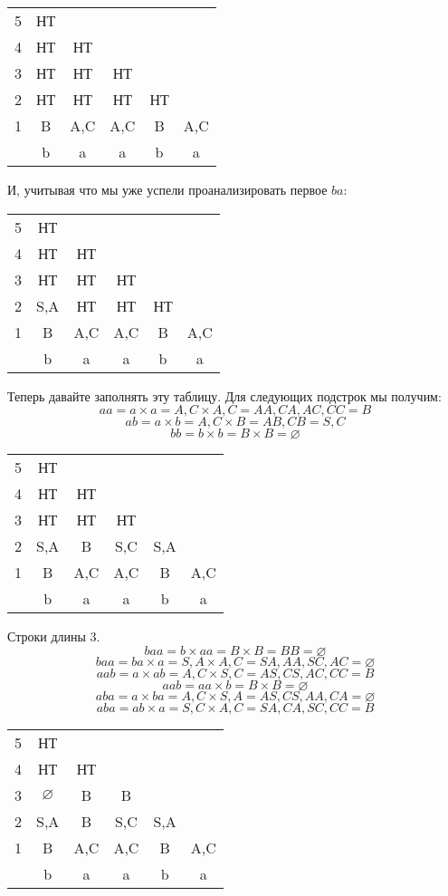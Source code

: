 \documentclass{article}
\begin{document}
\begin{center}
    \begin{tabular}{ c c c c c c}
    5 & НТ & & & & \\ 
    4 & НТ & НТ & &  \\  
    3 & НТ & НТ & НТ &  \\  
    2 & НТ & НТ & НТ & НТ  \\  
    1 & B & A,C & A,C & B & A,C  \\
      & b  &  a &  a & b  &  a 
    \end{tabular}
\end{center}
И, учитывая что мы уже успели проанализировать первое $ba$:
\begin{center}
    \begin{tabular}{ c c c c c c}
    5 & НТ & & & & \\ 
    4 & НТ & НТ & &  \\  
    3 & НТ & НТ & НТ &  \\  
    2 & S,A & НТ & НТ & НТ  \\  
    1 & B & A,C & A,C & B & A,C  \\
      & b  &  a &  a & b  &  a 
    \end{tabular}
\end{center}
Теперь давайте заполнять эту таблицу. Для следующих подстрок мы получим:
$$aa = a\times a = A,C \times A,C = AA, CA, AC, CC = B$$
$$ab = a\times b = A,C \times B = AB, CB = S, C$$
$$bb = b\times b = B \times B = \varnothing$$
\begin{center}
    \begin{tabular}{ c c c c c c}
    5 & НТ & & & & \\ 
    4 & НТ & НТ & &  \\  
    3 & НТ & НТ & НТ &  \\  
    2 & S,A & B & S,C & S,A  \\  
    1 & B & A,C & A,C & B & A,C  \\
      & b  &  a &  a & b  &  a 
    \end{tabular}
\end{center}
Строки длины 3.
$$baa = b\times aa = B \times B = BB = \varnothing$$
$$baa = ba\times a = S,A \times A,C = SA, AA, SC, AC = \varnothing$$
$$aab = a\times ab = A,C \times S,C = AS, CS, AC, CC = B$$
$$aab = aa\times b = B \times B = \varnothing$$
$$aba = a\times ba = A,C \times S,A = AS, CS, AA, CA = \varnothing$$
$$aba = ab\times a = S,C \times A,C = SA, CA, SC, CC = B$$
\begin{center}
    \begin{tabular}{ c c c c c c}
    5 & НТ & & & & \\ 
    4 & НТ & НТ & &  \\  
    3 & $\varnothing$ & B & B &  \\  
    2 & S,A & B & S,C & S,A  \\  
    1 & B & A,C & A,C & B & A,C  \\
      & b  &  a &  a & b  &  a 
    \end{tabular}
\end{center}
\end{document}
